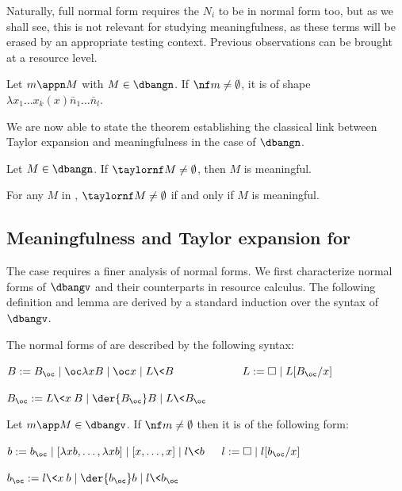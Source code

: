 Naturally, full normal form requires the $N_i$ to be in normal form too, but as
we shall see, this is not relevant for studying meaningfulness, as these terms
will be erased by an appropriate testing context. 
Previous observations can be brought at a resource level.
\begin{lemma}\label{lem:dbangn_nf}
	Let $m\appn M$ with $M\in\dbangn$. If $\nf m\neq\emptyset$, it is of shape $\lambda
	x_1\dots x_k(x)\bar n_1\dots \bar n_l$.
\end{lemma}

We are now able to state the theorem establishing the classical link between Taylor
expansion and meaningfulness in the case of $\dbangn$.
\begin{theorem}\label{thm:dbangn_tnf}
	Let $M\in\dbangn$. If $\taylornf M\neq\emptyset$, then $M$ is
	meaningful.
\end{theorem}

\begin{corollary}\label{cor:dcbn_meaningful}
	For any $M$ in \dcbn, $\taylornf M\neq\emptyset$ if and only if $M$ is
	meaningful.
\end{corollary}

\subsection{Meaningfulness and Taylor expansion for \dcbv}
The \dcbv{} case requires a finer analysis of normal forms. 
We first characterize normal forms of $\dbangv$ and their counterparts in resource
calculus. The following definition and lemma are derived by a standard induction over the
syntax of $\dbangv$.

\begin{definition}\label{def:syntax_nf_dbangv}
	The normal forms of \dbangv are described by the following syntax:

	$B:=B_\oc\mid\oc\lambda xB\mid \oc x\mid L\<B\> \qquad\qquad\qquad L:= \square\mid L[B_\oc/x]$

	$B_\oc :=L\<x\>B\mid \der{B_\oc}B\mid L\<B_\oc\>$


\end{definition}

\begin{lemma}\label{lem:syntax_nf_dbangvres}
	Let $m\app M\in\dbangv$. If $\nf m\neq \emptyset$ then it is of the
	following form:

	$b:= b_\oc \mid [\lambda xb,\dots ,\lambda xb]\mid [x,\dots ,x]\mid l\<b\> \quad~ l:= \square\mid l[b_\oc/x]$

	$b_\oc :=l\<x\>b\mid \der{b_\oc}b\mid l\<b_\oc\>$

	
\end{lemma}

